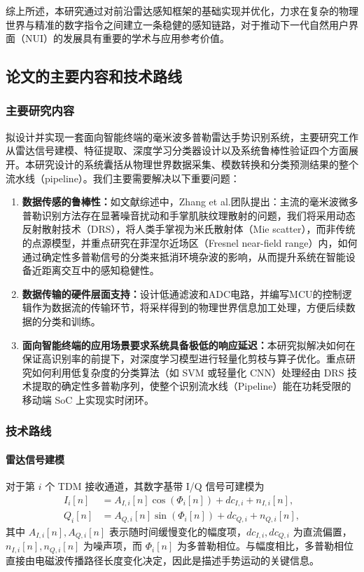 综上所述，本研究通过对前沿雷达感知框架的基础实现并优化，力求在复杂的物理世界与精准的数字指令之间建立一条稳健的感知链路，对于推动下一代自然用户界面（NUI）的发展具有重要的学术与应用参考价值。

\subsection{论文的主要内容和技术路线}

\subsubsection{主要研究内容}
拟设计并实现一套面向智能终端的毫米波多普勒雷达手势识别系统，主要研究工作从雷达信号建模、特征提取、深度学习分类器设计以及系统鲁棒性验证四个方面展开。本研究设计的系统囊括从物理世界数据采集、模数转换和分类预测结果的整个流水线（pipeline）。我们主要需要解决以下重要问题：
\begin{enumerate}
    \item \textbf{数据传感的鲁棒性：}如文献综述中，Zhang et al.团队提出：主流的毫米波微多普勒识别方法存在显著噪音扰动和手掌肌肤纹理散射的问题\cite{mainpaper}，我们将采用动态反射散射技术（DRS），将人类手掌视为米氏散射体（Mie scatter），而非传统的点源模型，并重点研究在菲涅尔近场区（Fresnel near-field range）内，如何通过确定性多普勒信号的分类来抵消环境杂波的影响，从而提升系统在智能设备近距离交互中的感知稳健性。
    \item \textbf{数据传输的硬件层面支持：}设计低通滤波和ADC电路，并编写MCU的控制逻辑作为数据流的传输环节，将采样得到的物理世界信息加工处理，方便后续数据的分类和训练。
    \item \textbf{面向智能终端的应用场景要求系统具备极低的响应延迟：}本研究拟解决如何在保证高识别率的前提下，对深度学习模型进行轻量化剪枝与算子优化。重点研究如何利用低复杂度的分类算法（如 SVM 或轻量化 CNN）处理经由 DRS 技术提取的确定性多普勒序列，使整个识别流水线（Pipeline）能在功耗受限的移动端 SoC 上实现实时闭环。
\end{enumerate}

\subsubsection{技术路线}
\paragraph{雷达信号建模}
对于第 $i$ 个 TDM 接收通道，其数字基带 I/Q 信号可建模为
\begin{equation}
\begin{aligned}
I_i[n] &= A_{I,i}[n]\cos(\Phi_i[n]) + dc_{I,i} + n_{I,i}[n],\\
Q_i[n] &= A_{Q,i}[n]\sin(\Phi_i[n]) + dc_{Q,i} + n_{Q,i}[n],
\end{aligned}
\end{equation}
其中 $A_{I,i}[n],A_{Q,i}[n]$ 表示随时间缓慢变化的幅度项，$dc_{I,i},dc_{Q,i}$ 为直流偏置，$n_{I,i}[n],n_{Q,i}[n]$ 为噪声项，而 $\Phi_i[n]$ 为多普勒相位。与幅度相比，多普勒相位直接由电磁波传播路径长度变化决定，因此是描述手势运动的关键信息。

